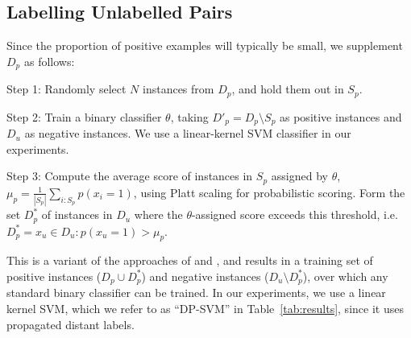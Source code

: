 \documentclass[letterpaper]{sig-alternate-2013}
\newcommand{\tabref}[1]{Table~\ref{#1}\xspace}
\begin{document}



\subsection{Labelling Unlabelled Pairs} 
\label{sec:labelling}

Since the proportion of positive examples will typically be small, we
supplement $D_p$ as follows:
\begin{compactitem}
\item Step 1: Randomly select $N$ instances from $D_{p}$, and hold them out in $S_{p}$.
\item Step 2: Train a binary classifier $\theta$, taking $D'_{p} = D_p \setminus S_p$ as positive instances and $D_{u}$ as negative instances. We use a linear-kernel SVM classifier in our experiments.
\item Step 3: Compute the average score of instances in $S_{p}$ assigned by $\theta$, \mbox{$\mu_{p} = \frac{1}{|S_{p}|}\sum_{i:S_{p}} p(x_{i}=1)$,} using Platt scaling for probabilistic scoring. Form the set $D_p^*$ of instances in $D_{u}$ where the $\theta$-assigned score exceeds this threshold, i.e.\ $D_p^* = {x_u \in D_u: p(x_{u}=1) > \mu_{p}}$.
\end{compactitem}

This is a variant of the approaches of \cite{Elkan:2008:LCO:1401890.1401920} and \cite{liu2002partially}, and results in a training set of positive instances ($D_{p} \cup D^*_{p}$) and negative instances ($D_{u} \setminus D^*_{p}$), over which any standard binary classifier can be trained. In our experiments, we use a linear kernel SVM, which we refer to as ``DP-SVM'' in \tabref{tab:results}, since it uses propagated distant labels.
\end{document}

